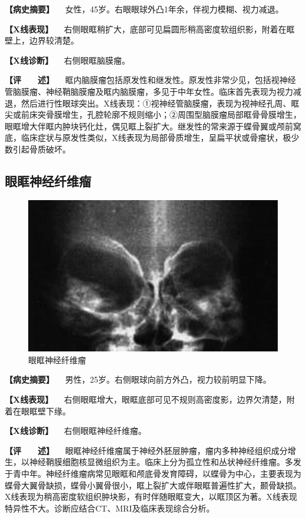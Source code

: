 \textbf{【病史摘要】}
　女性，45岁。右眼眼球外凸1年余，伴视力模糊、视力减退。

\textbf{【X线表现】}
　右侧眼眶稍扩大，底部可见扁圆形稍高密度软组织影，附着在眶壁上，边界较清楚。

\textbf{【X线诊断】} 　右侧眼眶脑膜瘤。

\textbf{【评　　述】}
　眶内脑膜瘤包括原发性和继发性。原发性非常少见，包括视神经管脑膜瘤、神经鞘脑膜瘤及眶内脑膜瘤，多见于中年女性。临床首先表现为视力减退，然后进行性眼球突出。X线表现：①视神经管脑膜瘤，表现为视神经孔周、眶尖或前床突骨膜增生，孔腔轮廓不规则缩小；②周围型脑膜瘤局部眶骨骨膜增生，眼眶增大伴眶内肿块钙化灶，偶见眶上裂扩大。继发性的常来源于蝶骨翼或颅前窝底，临床症状与原发性类似，X线表现为局部骨质增生，呈扁平状或骨瘤状，极少数引起骨质破坏。

\subsection{眼眶神经纤维瘤}

\begin{figure}[!htbp]
 \centering
 \includegraphics{./images/Image00420.jpg}
 \captionsetup{justification=centering}
 \caption{眼眶神经纤维瘤}
 \label{fig7-2-4}
  \end{figure} 

\textbf{【病史摘要】}
　男性，25岁。右侧眼球向前方外凸，视力较前明显下降。

\textbf{【X线表现】}
　右侧眼眶增大，眼眶底部可见不规则高密度影，边界欠清楚，附着在眼眶壁下缘。

\textbf{【X线诊断】} 　右侧眼眶神经纤维瘤。

\textbf{【评　　述】}
　眼眶神经纤维瘤属于神经外胚层肿瘤，瘤内多种神经组织成分增生，以神经鞘膜细胞核显微组织为主。临床上分为孤立性和丛状神经纤维瘤。多发于青中年。神经纤维瘤病常见眼眶和颅底骨发育障碍，以蝶骨为中心，主要表现为蝶骨大翼骨缺损，蝶骨小翼骨很小，眶上裂扩大或伴眼眶普遍性扩大，颞骨缺损。X线表现为稍高密度软组织肿块影，有时伴随眼眶变大，以眶顶区为著。X线表现特异性不大。诊断应结合CT、MRI及临床表现综合分析。

